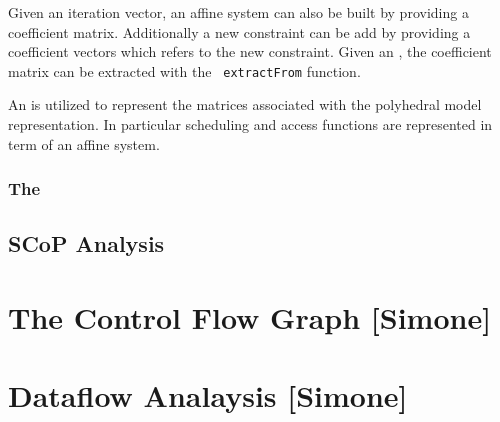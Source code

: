 Given an iteration vector, an affine system can also be built by providing a
coefficient matrix. Additionally a new constraint can be add by providing a
coefficient vectors which refers to the new constraint. Given an
, the coefficient matrix can be extracted with the {\tt
extractFrom} function. 

An  is utilized to represent the matrices associated with the
polyhedral model representation. In particular scheduling and access functions
are represented in term of an affine system. 

\subsubsection{The }

\subsection{SCoP Analysis}



\section{The Control Flow Graph [Simone]}
\label{insieme:analysis:cfg}



\section{Dataflow Analaysis [Simone]}
\label{insieme:analysis:dtaflow}

